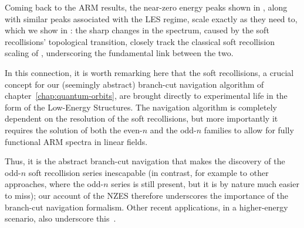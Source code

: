 Coming back to the ARM results, the near-zero energy peaks shown in , along with similar peaks associated with the LES regime, scale exactly as they need to, which we show in : the sharp changes in the spectrum, caused by the soft recollisions' topological transition, closely track the classical soft recollision scaling of , underscoring the fundamental link between the two.


In this connection, it is worth remarking here that the soft recollisions, a crucial concept for our (seemingly abstract) branch-cut navigation algorithm of chapter~\ref{chap:quantum-orbits}, are brought directly to experimental life in the form of the Low-Energy Structures. The navigation algorithm is completely dependent on the resolution of the soft recollisions, but more importantly it requires the solution of both the even-$n$ and the odd-$n$ families to allow for fully functional ARM spectra in linear fields. 

Thus, it is the abstract branch-cut navigation that makes the discovery of the odd-$n$ soft recollision series inescapable (in contrast, for example to other approaches, where the odd-$n$ series is still present, but it is by nature much easier to miss); our account of the NZES therefore underscores the importance of the branch-cut navigation formalism. Other recent applications, in a higher-energy scenario, also underscore this~\cite{keil_branch-cuts_2016}.



